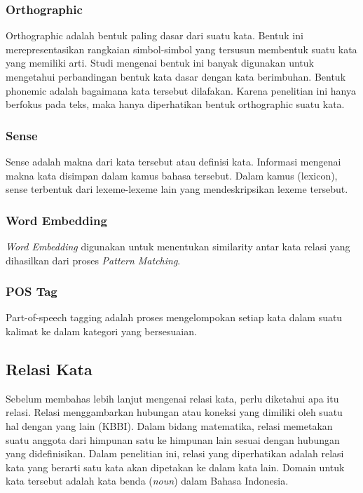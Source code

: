 \subsubsection{Orthographic}
Orthographic adalah bentuk paling dasar dari suatu kata. Bentuk ini merepresentasikan rangkaian simbol-simbol yang tersusun membentuk suatu kata yang memiliki arti. Studi mengenai bentuk ini banyak digunakan untuk mengetahui perbandingan bentuk kata dasar dengan kata berimbuhan. Bentuk phonemic adalah bagaimana kata tersebut dilafakan. Karena penelitian ini hanya berfokus pada teks, maka hanya diperhatikan bentuk orthographic suatu kata.

\subsubsection{Sense}
Sense adalah makna dari kata tersebut atau definisi kata. Informasi mengenai makna kata disimpan dalam kamus bahasa tersebut. Dalam kamus (lexicon), sense terbentuk dari lexeme-lexeme lain yang mendeskripsikan lexeme tersebut. 

\subsubsection{Word Embedding}
\textit{Word Embedding} digunakan untuk menentukan similarity antar kata relasi yang dihasilkan dari proses \textit{Pattern Matching}.

\subsubsection{POS Tag}
Part-of-speech tagging adalah proses mengelompokan setiap kata dalam suatu kalimat ke dalam kategori yang bersesuaian.  

\subsection{Relasi Kata}
Sebelum membahas lebih lanjut mengenai relasi kata, perlu diketahui apa itu relasi. Relasi menggambarkan hubungan atau koneksi yang dimiliki oleh suatu hal dengan yang lain (KBBI). Dalam bidang matematika, relasi memetakan suatu anggota dari himpunan satu ke himpunan lain sesuai dengan hubungan yang didefinisikan. Dalam penelitian ini, relasi yang diperhatikan adalah relasi kata yang berarti satu kata akan dipetakan ke dalam kata lain. Domain untuk kata tersebut adalah kata benda (\textit{noun}) dalam Bahasa Indonesia.

